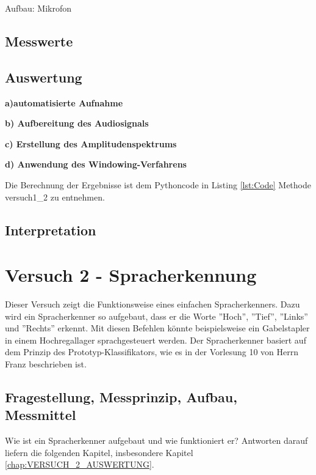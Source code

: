 \documentclass[12pt,oneside,a4paper]{report}
\begin{document}
Aufbau: Mikrofon

\section{Messwerte}
\label{chap:VERSUCH_1_MESSWERTE}

\section{Auswertung}
\label{chap:VERSUCH_1_AUSWERTUNG}
\textbf{a)automatisierte Aufnahme}

\textbf{b) Aufbereitung des Audiosignals}

\textbf{c) Erstellung des Amplitudenspektrums}

\textbf{d) Anwendung des Windowing-Verfahrens}

Die Berechnung der Ergebnisse ist dem Pythoncode in Listing \ref{lst:Code} Methode versuch1\_2 zu entnehmen.

\section{Interpretation}
\label{chap:VERSUCH_1_INTERPRETATION}

%
%
\chapter{Versuch 2 - Spracherkennung}
\label{chap:VERSUCH_2}

Dieser Versuch zeigt die Funktionsweise eines einfachen Spracherkenners.
Dazu wird ein Spracherkenner so aufgebaut, dass er die Worte ''Hoch'', ''Tief'', ''Links'' und ''Rechts'' erkennt. Mit diesen Befehlen könnte beispielsweise ein Gabelstapler in einem Hochregallager sprachgesteuert werden. Der Spracherkenner basiert auf dem Prinzip des Prototyp-Klassifikators, wie es in der Vorlesung 10 von Herrn Franz \cite{Franz2015i} beschrieben ist.

\section{Fragestellung, Messprinzip, Aufbau, Messmittel}
\label{chap:VERSUCH_2_FRAGESTELLUNG}

Wie ist ein Spracherkenner aufgebaut und wie funktioniert er?
Antworten darauf liefern die folgenden Kapitel, insbesondere Kapitel \ref{chap:VERSUCH_2_AUSWERTUNG}.

\paragraph{}
\end{document}
